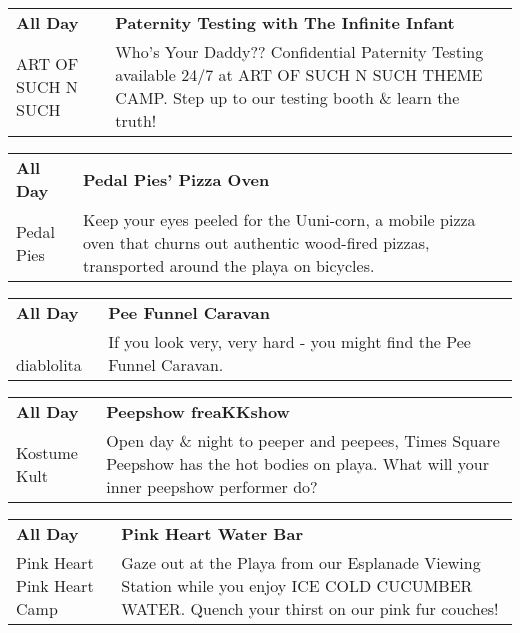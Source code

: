 \begin{tabular}{ p{1in} p{2.2in} }
    \textbf{All Day} & \textbf{Paternity Testing with The Infinite Infant} \\
    ART OF SUCH N SUCH \newline  & Who's Your Daddy?? Confidential Paternity Testing available 24/7 at ART OF SUCH N SUCH THEME CAMP. Step up to our testing booth \& learn the truth! \\
    \hline 
\end{tabular}
    
\begin{tabular}{ p{1in} p{2.2in} }
    \textbf{All Day} & \textbf{Pedal Pies' Pizza Oven} \\
    Pedal Pies \newline  & Keep your eyes peeled for the Uuni-corn, a mobile pizza oven that churns out authentic wood-fired pizzas, transported around the playa on bicycles. \\
    \hline 
\end{tabular}
    
\begin{tabular}{ p{1in} p{2.2in} }
    \textbf{All Day} & \textbf{Pee Funnel Caravan} \\
    ~ \newline diablolita & If you look very, very hard - you might find the Pee Funnel Caravan. \\
    \hline 
\end{tabular}
    
\begin{tabular}{ p{1in} p{2.2in} }
    \textbf{All Day} & \textbf{Peepshow freaKKshow} \\
    Kostume Kult \newline  & Open day \& night to peeper and peepees, Times Square Peepshow has the hot bodies on playa. What will your inner peepshow performer do? \\
    \hline 
\end{tabular}
    
\begin{tabular}{ p{1in} p{2.2in} }
    \textbf{All Day} & \textbf{Pink Heart Water Bar} \\
    Pink Heart \newline Pink Heart Camp & Gaze out at the Playa from our Esplanade Viewing Station while you enjoy ICE COLD CUCUMBER WATER. Quench your thirst on our pink fur couches! \\
    \hline 
\end{tabular}
    
